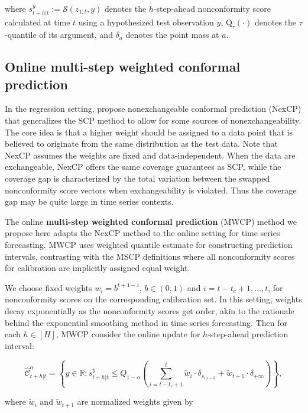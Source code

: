 \documentclass[
  11pt,
  a4paper,
]{article}
\theoremstyle{plain}
\theoremstyle{remark}
\begin{document}
where \(s_{t+h|t}^{y}:=\mathcal{S}(z_{1:t}, y)\) denotes the
\(h\)-step-ahead nonconformity score calculated at time \(t\) using a
hypothesized test observation \(y\), \(\mathrm{Q}_\tau(\cdot)\) denotes
the \(\tau\)-quantile of its argument, and \(\delta_a\) denotes the
point mass at \(a\).

\subsection{Online multi-step weighted conformal
prediction}\label{online-multi-step-weighted-conformal-prediction}

In the regression setting, \textcite{barber2023} propose nonexchangeable
conformal prediction (NexCP) that generalizes the SCP method to allow
for some sources of nonexchangeability. The core idea is that a higher
weight should be assigned to a data point that is believed to originate
from the same distribution as the test data. Note that NexCP assumes the
weights are fixed and data-independent. When the data are exchangeable,
NexCP offers the same coverage guarantees as SCP, while the coverage gap
is characterized by the total variation between the swapped
nonconformity score vectors when exchangeability is violated. Thus the
coverage gap may be quite large in time series contexts.

The online \textbf{multi-step weighted conformal prediction} (MWCP)
method we propose here adapts the NexCP method to the online setting for
time series forecasting. MWCP uses weighted quantile estimate for
constructing prediction intervals, contrasting with the MSCP definitions
where all nonconformity scores for calibration are implicitly assigned
equal weight.

We choose fixed weights \(w_i = b^{t+1-i}\), \(b \in (0, 1)\) and
\(i=t-t_c+1,\ldots,t\), for nonconformity scores on the corresponding
calibration set. In this setting, weights decay exponentially as the
nonconformity scores get order, akin to the rationale behind the
exponential smoothing method in time series forecasting. Then for each
\(h \in [H]\), MWCP consider the online update for \(h\)-step-ahead
prediction interval:

\[
\hat{\mathcal{C}}_{t+h|t}^{\alpha} = \left\{y\in\mathbb{R}: s_{t+h|t}^{y} \leq Q_{1-\alpha}\left(\sum_{i=t-t_c+1}^{t}\tilde{w}_i\cdot\delta_{s_{i|i-h}}+\tilde{w}_{t+1}\cdot\delta_{+\infty}\right)\right\},
\]

where \(\tilde{w}_i\) and \(\tilde{w}_{t+1}\) are normalized weights
given by
\end{document}
